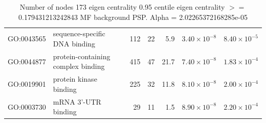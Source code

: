 \begin{table}[ht]
\begin{adjustbox}{max width=\textwidth}
\begin{tabular}{llrrrrr}
  GO:0043565 & sequence-specific DNA binding & 112 & 22 & 5.9 & $3.40 \times 10^{-8}$ & $8.40 \times 10^{-5}$ \\ 
  GO:0044877 & protein-containing complex binding & 415 & 47 & 21.7 & $7.40 \times 10^{-8}$ & $1.83 \times 10^{-4}$ \\ 
  GO:0019901 & protein kinase binding & 225 & 32 & 11.8 & $8.10 \times 10^{-8}$ & $2.00 \times 10^{-4}$ \\ 
  GO:0003730 & mRNA 3'-UTR binding & 29 & 11 & 1.5 & $8.90 \times 10^{-8}$ & $2.20 \times 10^{-4}$ \\ 
   \hline
\end{tabular}
\end{adjustbox}
\caption{Number of nodes 173 eigen centrality 0.95 centile  eigen centrality $>=$ 0.179431213242843 MF background PSP. Alpha = 2.02265372168285e-05} 
\label{tab:Number of nodes 173 eigen centrality 0.95 centile  eigen centrality $>=$ 0.179431213242843 MF background PSP. Alpha = 2.02265372168285e-05}
\end{table}


